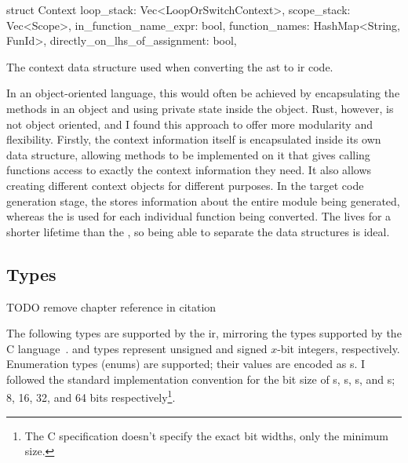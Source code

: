 \documentclass[00-main.tex]{subfiles}
\begin{document}
\begin{listing}[t]
  \begin{RustListing}
    struct Context {
        loop_stack: Vec<LoopOrSwitchContext>,
        scope_stack: Vec<Scope>,
        in_function_name_expr: bool,
        function_names: HashMap<String, FunId>,
        directly_on_lhs_of_assignment: bool,
    }
  \end{RustListing}
  \caption{The context data structure used when converting the \gls{ast} to \gls{ir} code.}
  \label{lst:AST to IR context struct}
\end{listing}

In an object-oriented language, this would often be achieved by encapsulating the methods in an object and using private state inside the object.
Rust, however, is not object oriented, and I found this approach to offer more modularity and flexibility.
Firstly, the context information itself is encapsulated inside its own data structure, allowing methods to be implemented on it that gives calling functions access to exactly the context information they need.
It also allows creating different context objects for different purposes.
In the target code generation stage, the  stores information about the entire module being generated, whereas the  is used for each individual function being converted.
The  lives for a shorter lifetime than the , so being able to separate the data structures is ideal.


\subsection{Types}

\begin{mrwComment}
TODO remove chapter reference in citation
\end{mrwComment}

The following types are supported by the \gls{ir}, mirroring the types supported by the C language~.
 and  types represent unsigned and signed $x$-bit integers, respectively.
Enumeration types (enums) are supported; their values are encoded as s.
I followed the standard implementation convention for the bit size of s, s, s, and s; 8, 16, 32, and 64 bits respectively\footnote{The C specification doesn't specify the exact bit widths, only the minimum size.}.
\end{document}
